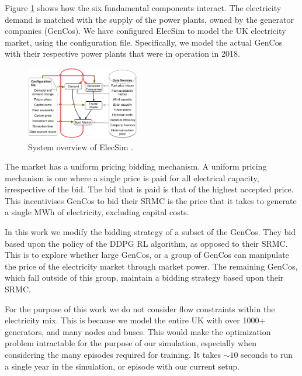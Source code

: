 \documentclass[conference]{IEEEtran}
\begin{document}
Figure \ref{fig:model_details} shows how the six fundamental components interact. The electricity demand is matched with the supply of the power plants, owned by the generator companies (GenCos). We have configured ElecSim to model the UK electricity market, using the configuration file. Specifically, we model the actual GenCos with their respective power plants that were in operation in 2018.



\begin{figure}
    \includegraphics[width=0.44\textwidth]{figures/methedology/System_overview_large.png}
    \caption{System overview of ElecSim \cite{Kell}.}
    \label{fig:model_details}
\end{figure}

The market has a uniform pricing bidding mechanism. A uniform pricing mechanism is one where a single price is paid for all electrical capacity, irrespective of the bid. The bid that is paid is that of the highest accepted price. This incentivises GenCos to bid their SRMC is the price that it takes to generate a single MWh of electricity, excluding capital costs. 

In this work we modify the bidding strategy of a subset of the GenCos. They bid based upon the policy of the DDPG RL algorithm, as opposed to their SRMC. This is to explore whether large GenCos, or a group of GenCos can manipulate the price of the electricity market through market power. The remaining GenCos, which fall outside of this group, maintain a bidding strategy based upon their SRMC.

For the purpose of this work we do not consider flow constraints within the electricity mix. This is because we model the entire UK with over 1000+ generators, and many nodes and buses. This would make the optimization problem intractable for the purpose of our simulation, especially when considering the many episodes required for training. It takes ${\sim}10$ seconds to run a single year in the simulation, or episode with our current setup. 




\end{document}
